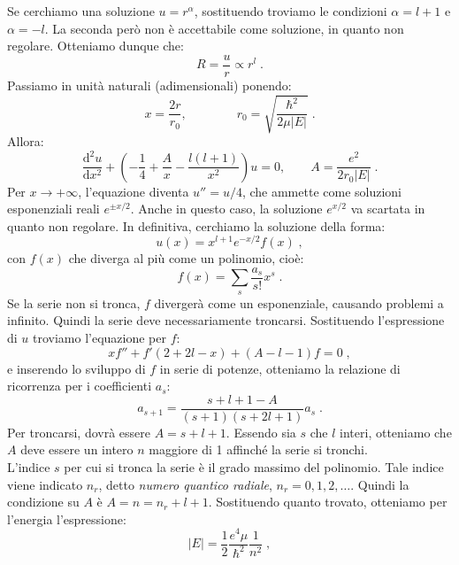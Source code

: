 \documentclass[12pt,a4paper]{report}
\theoremstyle{definition}
\newcommand{\dev}[3][]{\frac{\mathrm{d}^{#1} #2}{\mathrm{d} #3^{#1}}}
\numberwithin{equation}{section}
\begin{document}
Se cerchiamo una soluzione $u=r^{\alpha}$, sostituendo troviamo le condizioni $\alpha=l+1$ e $\alpha=-l$. La seconda però non è accettabile come soluzione, in quanto non regolare. Otteniamo dunque che:
\begin{equation}
R=\frac{u}{r}\propto r^l\;.
\end{equation}
Passiamo in unità naturali (adimensionali) ponendo:
\begin{equation}
x=\frac{2r}{r_0}, \qquad \qquad r_0=\sqrt{\frac{\hbar^2}{2\mu|E|}}\;.
\end{equation}
Allora:
\begin{equation}
\dev[2]{u}{x}+\left(-\frac{1}{4}+\frac{A}{x}-\frac{l(l+1)}{x^2}\right)u=0, \qquad A=\frac{e^2}{2r_0|E|}\;.
\end{equation}
Per $x\to+\infty$, l'equazione diventa $u''=u/4$, che ammette come soluzioni esponenziali reali $e^{\pm x/2}$. Anche in questo caso, la soluzione $e^{x/2}$ va scartata in quanto non regolare. In definitiva, cerchiamo la soluzione della forma:
\begin{equation}
u(x)=x^{l+1}e^{-x/2}f(x)\;,
\end{equation}
con $f(x)$ che diverga al più come un polinomio, cioè:
\begin{equation}
f(x)=\sum_s \frac{a_s}{s!}x^s\;.
\end{equation}
Se la serie non si tronca, $f$ divergerà come un esponenziale, causando problemi a infinito. Quindi la serie deve necessariamente troncarsi. Sostituendo l'espressione di $u$ troviamo l'equazione per $f$:
\begin{equation}
xf''+f'(2+2l-x)+(A-l-1)f=0\;,
\end{equation}
e inserendo lo sviluppo di $f$ in serie di potenze, otteniamo la relazione di ricorrenza per i coefficienti $a_s$:
\begin{equation}
a_{s+1}=\frac{s+l+1-A}{(s+1)(s+2l+1)}a_s\;.
\end{equation}
Per troncarsi, dovrà essere $A=s+l+1$. Essendo sia $s$ che $l$ interi, otteniamo che $A$ deve essere un intero $n$ maggiore di 1 affinché la serie si tronchi. \\
L'indice $s$ per cui si tronca la serie è il grado massimo del polinomio. Tale indice viene indicato $n_r$, detto \textit{numero quantico radiale}, $n_r=0,1,2,\ldots$. Quindi la condizione su $A$ è $A=n=n_r+l+1$. Sostituendo quanto trovato, otteniamo per l'energia l'espressione:
\begin{equation}
|E|=\frac{1}{2}\frac{e^4\mu}{\hbar^2}\frac{1}{n^2}\;,
\end{equation}
\end{document}
